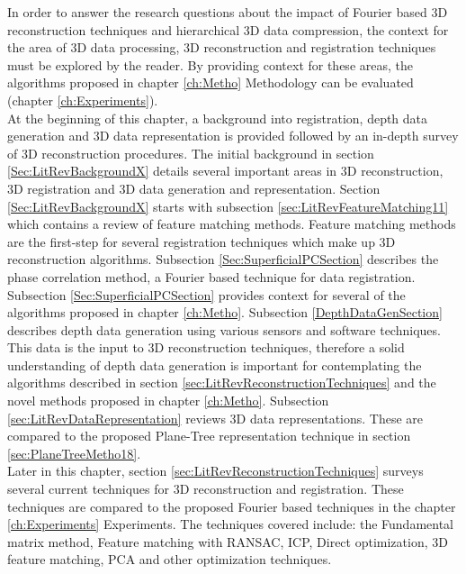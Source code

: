 
In order to answer the research questions about the impact of Fourier based 3D reconstruction techniques and hierarchical 3D data compression, the context for the area of 3D data processing, 3D reconstruction and registration techniques must be explored by the reader. By providing context for these areas, the algorithms proposed in chapter \ref{ch:Metho} Methodology can be evaluated (chapter \ref{ch:Experiments}). \\

At the beginning of this chapter, a background into registration, depth data generation and 3D data representation is provided followed by an in-depth survey of 3D reconstruction procedures. The initial background in section \ref{Sec:LitRevBackgroundX} details several important areas in 3D reconstruction, 3D registration and 3D data generation and representation. Section \ref{Sec:LitRevBackgroundX} starts with subsection \ref{sec:LitRevFeatureMatching11} which contains a review of feature matching methods. Feature matching methods are the first-step for several registration techniques which make up 3D reconstruction algorithms. Subsection \ref{Sec:SuperficialPCSection} describes the phase correlation method, a Fourier based technique for data registration. Subsection \ref{Sec:SuperficialPCSection} provides context for several of the algorithms proposed in chapter \ref{ch:Metho}. Subsection \ref{DepthDataGenSection} describes depth data generation using various sensors and software techniques. This data is the input to 3D reconstruction techniques, therefore a solid understanding of depth data generation is important for contemplating the algorithms described in section \ref{sec:LitRevReconstructionTechniques} and the novel methods proposed in chapter \ref{ch:Metho}. Subsection \ref{sec:LitRevDataRepresentation} reviews 3D data representations. These are compared to the proposed Plane-Tree representation technique in section \ref{sec:PlaneTreeMetho18}. \\

Later in this chapter, section \ref{sec:LitRevReconstructionTechniques} surveys several current techniques for 3D reconstruction and registration. These techniques are compared to the proposed Fourier based techniques in the chapter \ref{ch:Experiments} Experiments. The techniques covered include: the Fundamental matrix method, Feature matching with RANSAC, ICP, Direct optimization, 3D feature matching, PCA and other optimization techniques. \\

